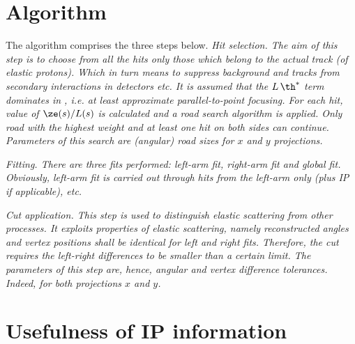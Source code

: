 \section[algo]{Algorithm}

The algorithm comprises the three steps below.
\bitm
\itm \em{Hit selection}. The aim of this step is to choose from all the hits only those which belong to the actual track (of elastic protons). Which in turn means to suppress background and tracks from secondary interactions in detectors etc. It is assumed that the $L\,\th^*$ term dominates in , i.e\hbox{.} at least approximate parallel-to-point focusing. For each hit, value of $\ze(s) / L(s)$ is calculated and a road search algorithm is applied. Only road with the highest weight and at least one hit on both sides can continue. Parameters of this search are (angular) road sizes for $x$ and $y$ projections.


\itm \em{Fitting}. There are three fits performed: left-arm fit, right-arm fit and global fit. Obviously, left-arm fit is carried out through hits from the left-arm only (plus IP if applicable), etc.

\itm \em{Cut application}. This step is used to distinguish elastic scattering from other processes. It exploits properties of elastic scattering, namely reconstructed angles and vertex positions shall be identical for left and right fits. Therefore, the cut requires the left-right differences to be smaller than a certain limit. The parameters of this step are, hence, angular and vertex difference tolerances. Indeed, for both projections $x$ and $y$.
\eitm

\break
\section[ip]{Usefulness of IP information}

